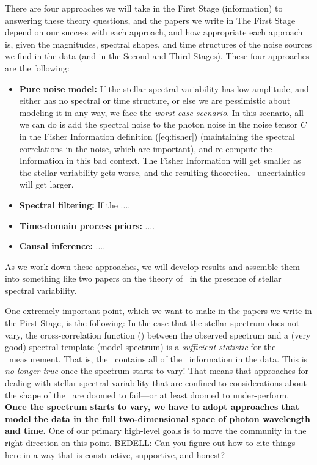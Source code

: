 \documentclass[12pt, letterpaper]{article}
\begin{document}
There are four approaches we will take in the First Stage (information)
to answering these theory questions,
and the papers we write in The First Stage depend on our success with each
approach, and how appropriate each approach is, given the magnitudes, spectral
shapes, and time structures of the noise sources we find in the data (and in
the Second and Third Stages).
These four approaches are the following:
\begin{itemize}
\item
\textbf{Pure noise model:}
If the stellar spectral variability has low amplitude, and either has
no spectral or time structure, or else we are pessimistic about
modeling it in any way, we face the \emph{worst-case scenario}.
In this scenario, all we can do is add the spectral noise to the photon noise
in the noise tensor $C$ in the Fisher Information definition (\ref{eq:fisher})
(maintaining the spectral correlations in the noise, which are important),
and re-compute the Information in this bad context.
The Fisher Information will get smaller as the stellar variability
gets worse, and the resulting theoretical \EPRV\ uncertainties will
get larger.
\item
\textbf{Spectral filtering:}
If the ....
\item
\textbf{Time-domain process priors:} ....
\item
\textbf{Causal inference:} ....
\end{itemize}
As we work down these approaches, we will develop results and assemble them
into something like two papers on the theory of \EPRV\ in the presence of
stellar spectral variability.

One extremely important point, which we want to make in the papers we write
in the First Stage, is the following:
In the case that the stellar spectrum does not vary, the
cross-correlation function (\CCF) between the observed spectrum and a
(very good) spectral template (model spectrum) is a \emph{sufficient
  statistic} for the \RV\ measurement.
That is, the \CCF\ contains all of the \RV\ information in the data.
This is \emph{no longer true} once the spectrum starts to vary!
That means that approaches for dealing with stellar spectral variability
that are confined to considerations about the shape of the \CCF\ are
doomed to fail---or at least doomed to under-perform.
\textbf{Once the spectrum starts to vary, we have to adopt approaches that model
the data in the full two-dimensional space of photon wavelength and time.}
One of our primary high-level goals is to move the community in the
right direction on this point.
BEDELL: Can you figure out how to cite things here in a way that is constructive,
supportive, and honest?
\end{document}
